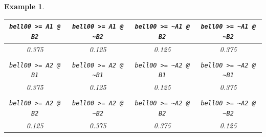 \documentclass[leqno]{tufte-book} %
\makeatletter
\newtheorem{example}[theorem]{Example}
\newcommand\pythonstyle{\lstset{
language=Python,
basicstyle=\ttm,
otherkeywords={self,>>>},             %
keywordstyle=\ttb\small\color{deepblue},
emph={@,+\%%
literate={.+}{{{\color{red}.+}}}2 {.**}{{{\color{red}.\**{}}}}2 {*}{{{\color{red}*}}}1
},          %
emphstyle=\ttb\small\color{deepred},    %
stringstyle=\small\color{deepgreen},
frame=tb,                         %
showstringspaces=false            %
}}
\newcommand\pythoninline[1]{\pythonstyle\lstinline[basicstyle=\normalfont\ttfamily\small]{#1}} %
\makeatother
\begin{document}
\begin{example}
\begin{fullwidth}
\begin{center}
\begin{tabular}{c|c|c|c}



{\pythoninline{bell00 >= A1 @ B2}} &
   {\pythoninline{bell00 >= A1 @ ~B2}} &
   {\pythoninline{bell00 >= ~A1 @ B2}} &
   {\pythoninline{bell00 >= ~A1 @ ~B2}}
\\
\hline
\hline
0.375 & 0.125 & 0.125 & 0.375
\\
\hline
& & & \\




{\pythoninline{bell00 >= A2 @ B1}} &
   {\pythoninline{bell00 >= A2 @ ~B1}} &
   {\pythoninline{bell00 >= ~A2 @ B1}} &
   {\pythoninline{bell00 >= ~A2 @ ~B1}}
\\
\hline
\hline
0.375 & 0.125 & 0.125 & 0.375
\\
\hline
& & & \\


{\pythoninline{bell00 >= A2 @ B2}} &
   {\pythoninline{bell00 >= A2 @ ~B2}} &
   {\pythoninline{bell00 >= ~A2 @ B2}} &
   {\pythoninline{bell00 >= ~A2 @ ~B2}}
\\
\hline
\hline
0.125 & 0.375 & 0.375 & 0.125
\end{tabular}
\end{center}
\end{fullwidth}
\end{example}
\end{document}
